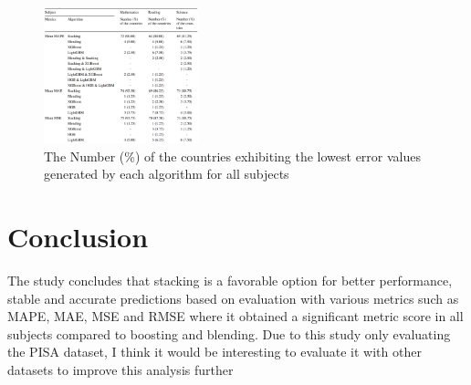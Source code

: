 \documentclass[final,5p,times,twocolumn,authoryear]{elsarticle}
\begin{document}
\begin{figure}
	\centering
	\includegraphics[width=0.4\textwidth]{figures/figure1}
	\caption{The Number (\%) of the countries exhibiting the lowest error values generated by each algorithm for all subjects \cite{Stacking}}
    \label{fig:results}
\end{figure}

\section{Conclusion}
The study \cite{Stacking} concludes that stacking is a favorable option for better performance, stable and accurate predictions based on evaluation with various metrics such as MAPE, MAE, MSE and RMSE where it obtained a significant metric score in all subjects compared to boosting and blending.
Due to this study only evaluating the PISA dataset, I think it would be interesting to evaluate it with other datasets to improve this analysis further










\end{document}
